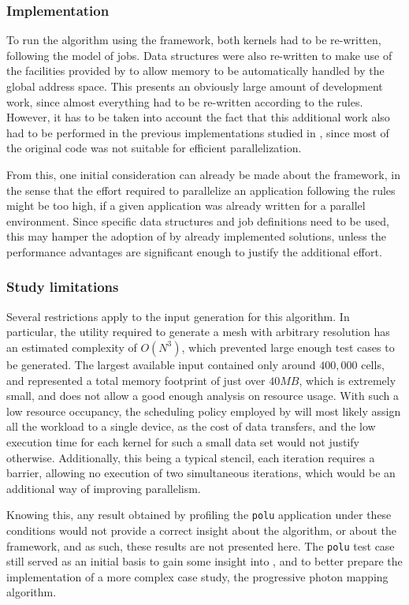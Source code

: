 \documentclass[main.tex]{subfiles}
\begin{document}
\subsubsection{Implementation}

To run the algorithm using the framework, both kernels had to be re-written, following the \gama model of jobs. Data structures were also re-written to make use of the facilities provided by \gama to allow memory to be automatically handled by the global address space.
This presents an obviously large amount of development work, since almost everything had to be re-written according to the \gama rules. However, it has to be taken into account the fact that this additional work also had to be performed in the previous implementations studied in \cite{naps2012}, since most of the original code was not suitable for efficient parallelization.

From this, one initial consideration can already be made about the framework, in the sense that the effort required to parallelize an application following the \gama rules might be too high, if a given application was already written for a parallel environment. Since specific data structures and job definitions need to be used, this may hamper the adoption of \gama by already implemented solutions, unless the performance advantages are significant enough to justify the additional effort.

\subsubsection{Study limitations}

Several restrictions apply to the input generation for this algorithm. In particular, the utility required to generate a mesh with arbitrary resolution has an estimated complexity of $O(N^3)$, which prevented large enough test cases to be generated. The largest available input contained only around $400,000$ cells, and represented a total memory footprint of just over $40MB$, which is extremely small, and does not allow a good enough analysis on resource usage. With such a low resource occupancy, the scheduling policy employed by \gama will most likely assign all the workload to a single device, as the cost of data transfers, and the low execution time for each kernel for such a small data set would not justify otherwise. Additionally, this being a typical stencil, each iteration requires a barrier, allowing no execution of two simultaneous iterations, which would be an additional way of improving parallelism.

Knowing this, any result obtained by profiling the \texttt{polu} application under these conditions would not provide a correct insight about the algorithm, or about the framework, and as such, these results are not presented here.
The \texttt{polu} test case still served as an initial basis to gain some insight into \gama, and to better prepare the implementation of a more complex case study, the progressive photon mapping algorithm.
\end{document}
